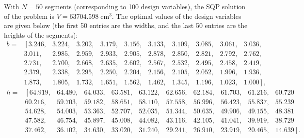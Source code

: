 \documentclass[runningheads,a4paper]{llncs}
\begin{document}
With $N=50$ segments (corresponding to 100 design variables), the SQP solution
of the problem is $V = 63704.598\;\text{cm}^3$. The optimal values of the
design variables are given below (the first 50 entries are the widths, and the
last 50 entries are the heights of the segments):
\setcounter{MaxMatrixCols}{11}
\[
\begin{matrix}%
			b=& \left[3.246, \right.& 3.224,& 3.202,& 3.179,& 3.156,& 3.133,& 3.109,& 3.085,& 3.061,& 3.036,  \\
			  & 3.011,& 2.985,& 2.959,& 2.933,& 2.905,& 2.878,& 2.850,& 2.821,& 2.792,& 2.762, \\
			  & 2.731,& 2.700,& 2.668,& 2.635,& 2.602,& 2.567,& 2.532,& 2.495,& 2.458,& 2.419, \\
			  & 2.379,& 2.338,& 2.295,& 2.250,& 2.204,& 2.156,& 2.105,& 2.052,& 1.996,& 1.936, \\
			  & 1.873,& 1.805,& 1.732,& 1.651,& 1.562,& 1.462,& 1.345,& 1.196,& 1.023,& \left. 1.000\right], 	
\end{matrix}
\]
\[
\begin{matrix}
	h=& \left[64.919,\right.&64.480,&64.033,&63.581,&63.122,&62.656,&62.184,&61.703,&61.216,&60.720  \\
		& 60.216,&59.703,&59.182,&58.651,&58.110,&57.558,&56.996,&56.423,&55.837,&55.239  \\
		& 54.628,&54.003,&53.363,&52.707,&52.035,&51.344,&50.635,&49.906,&49.155,&48.381  \\
		& 47.582,&46.754,&45.897,&45.008,&44.082,&43.116,&42.105,&41.041,&39.919,&38.729  \\
		& 37.462,&36.102,&34.630,&33.020,&31.240,&29.241,&26.910,&23.919,&20.465,&\left.14.639 \right].
\end{matrix}
\]
\end{document}
